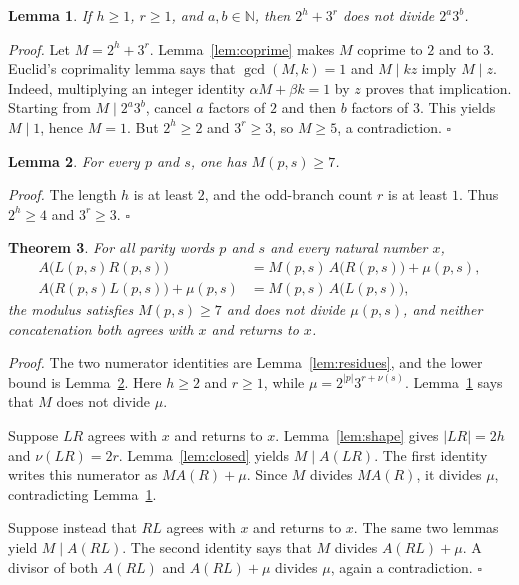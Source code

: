 \documentclass[11pt,letterpaper]{article}
\newcommand{\N}{\mathbb{N}}
\newtheorem{theorem}{Theorem}
\newtheorem{lemma}[theorem]{Lemma}
\newenvironment{proof}{\noindent\textit{Proof.}}{\hfill\(\square\)}
\begin{document}
\begin{lemma}
\label{lem:miss}
If \(h\ge 1\), \(r\ge 1\), and \(a,b\in\N\), then \(2^{h}+3^{r}\) does not divide \(2^{a}3^{b}\).
\end{lemma}

\begin{proof}
Let \(M=2^{h}+3^{r}\). Lemma~\ref{lem:coprime} makes \(M\) coprime to
\(2\) and to \(3\). Euclid's coprimality lemma says that
\(\gcd(M,k)=1\) and \(M\mid kz\) imply \(M\mid z\). Indeed, multiplying
an integer identity \(\alpha M+\beta k=1\) by \(z\) proves that implication.
Starting from \(M\mid 2^a3^b\), cancel \(a\) factors of \(2\) and then
\(b\) factors of \(3\). This yields \(M\mid1\), hence \(M=1\).
But \(2^h\ge2\) and \(3^r\ge3\), so \(M\ge5\), a contradiction.
\end{proof}

\begin{lemma}
\label{lem:seven}
For every \(p\) and \(s\), one has \(M(p,s)\ge 7\).
\end{lemma}

\begin{proof}
The length \(h\) is at least \(2\), and the odd-branch count \(r\) is at least \(1\). Thus \(2^{h}\ge 4\) and \(3^{r}\ge 3\).
\end{proof}

\begin{theorem}
\label{thm:transport}
For all parity words \(p\) and \(s\) and every natural number \(x\),
\begin{align*}
A\bigl(L(p,s)R(p,s)\bigr)
&=M(p,s)\,A\bigl(R(p,s)\bigr)+\mu(p,s),\\
A\bigl(R(p,s)L(p,s)\bigr)+\mu(p,s)
&=M(p,s)\,A\bigl(L(p,s)\bigr),
\end{align*}
the modulus satisfies \(M(p,s)\ge 7\) and does not divide \(\mu(p,s)\), and neither concatenation both agrees with \(x\) and returns to \(x\).
\end{theorem}

\begin{proof}
The two numerator identities are Lemma~\ref{lem:residues}, and the lower bound is Lemma~\ref{lem:seven}. Here \(h\ge 2\) and \(r\ge 1\), while \(\mu=2^{|p|}3^{r+\nu(s)}\). Lemma~\ref{lem:miss} says that \(M\) does not divide \(\mu\).

Suppose \(LR\) agrees with \(x\) and returns to \(x\). Lemma~\ref{lem:shape} gives \(|LR|=2h\) and \(\nu(LR)=2r\). Lemma~\ref{lem:closed} yields \(M\mid A(LR)\). The first identity writes this numerator as \(MA(R)+\mu\). Since \(M\) divides \(MA(R)\), it divides \(\mu\), contradicting Lemma~\ref{lem:miss}.

Suppose instead that \(RL\) agrees with \(x\) and returns to \(x\). The same two lemmas yield \(M\mid A(RL)\). The second identity says that \(M\) divides \(A(RL)+\mu\). A divisor of both \(A(RL)\) and \(A(RL)+\mu\) divides \(\mu\), again a contradiction.
\end{proof}
\end{document}
